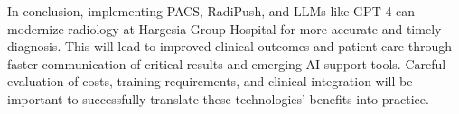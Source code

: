 \documentclass{article}
\begin{document}
In conclusion, implementing PACS, RadiPush, and LLMs like GPT-4 can modernize radiology at Hargesia Group Hospital for more accurate and timely diagnosis. This will lead to improved clinical outcomes and patient care through faster communication of critical results and emerging AI support tools. Careful evaluation of costs, training requirements, and clinical integration will be important to successfully translate these technologies' benefits into practice.
\end{document}
